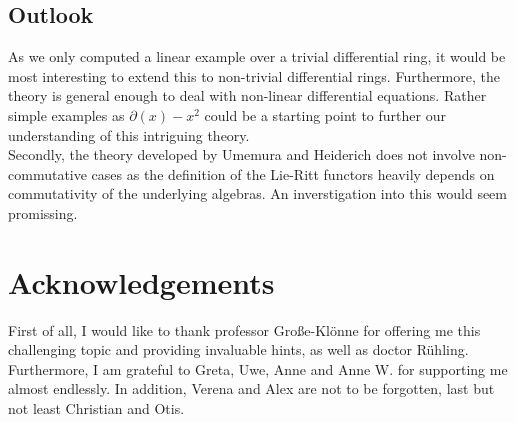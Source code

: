 \subsection{Outlook}
As we only computed a linear example over a trivial differential ring, it would be most interesting to extend this to non-trivial differential rings. Furthermore, the theory is general enough to deal with non-linear differential equations. Rather simple examples as $\partial(x) - x^2$ could be a starting point to further our understanding of this intriguing theory.\\
Secondly, the theory developed by Umemura and Heiderich does not involve non-commutative cases as the definition of the Lie-Ritt functors heavily depends on commutativity of the underlying algebras. An inverstigation  into this would seem promissing.
\newpage
\section*{Acknowledgements}
First of all, I would like to thank professor Gro\ss{}e-Kl\"onne for offering me this challenging topic and providing invaluable hints, as well as doctor R\"uhling. Furthermore, I am grateful to Greta, Uwe, Anne and Anne W. for supporting me almost endlessly. In addition, Verena and Alex are not to be forgotten, last but not least Christian and Otis.
\newpage
